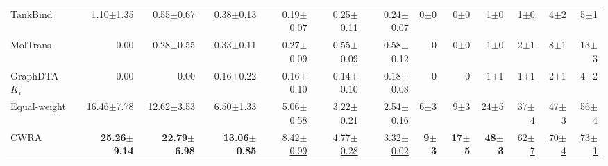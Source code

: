 \begin{table}[htbp!]
\begin{tabular}{lrrrrrr|rrrrrr}
TankBind & 1.10$\pm$1.35 & 0.55$\pm$0.67 & 0.38$\pm$0.13 & 0.19$\pm$0.07 & 0.25$\pm$0.11 & 0.24$\pm$0.07 & 0$\pm$0 & 0$\pm$0 & 1$\pm$0 & 1$\pm$0 & 4$\pm$2 & 5$\pm$1 \\
MolTrans & 0.00 & 0.28$\pm$0.55 & 0.33$\pm$0.11 & 0.27$\pm$0.09 & 0.55$\pm$0.09 & 0.58$\pm$0.12 & 0 & 0$\pm$0 & 1$\pm$0 & 2$\pm$1 & 8$\pm$1 & 13$\pm$3 \\
GraphDTA $K_{i}$ & 0.00 & 0.00 & 0.16$\pm$0.22 & 0.16$\pm$0.10 & 0.14$\pm$0.10 & 0.18$\pm$0.08 & 0 & 0 & 1$\pm$1 & 1$\pm$1 & 2$\pm$1 & 4$\pm$2 \\
\midrule
Equal-weight & 16.46$\pm$7.78 & 12.62$\pm$3.53 & 6.50$\pm$1.33 & 5.06$\pm$0.58 & 3.22$\pm$0.21 & 2.54$\pm$0.16 & 6$\pm$3 & 9$\pm$3 & 24$\pm$5 & 37$\pm$4 & 47$\pm$3 & 56$\pm$4 \\
CWRA & \textbf{25.26$\pm$9.14} & \textbf{22.79$\pm$6.98} & \textbf{13.06$\pm$0.85} & \underline{8.42$\pm$0.99} & \underline{4.77$\pm$0.28} & \underline{3.32$\pm$0.02} & \textbf{9$\pm$3} & \textbf{17$\pm$5} & \textbf{48$\pm$3} & \underline{62$\pm$7} & \underline{70$\pm$4} & \underline{73$\pm$1} \\
\bottomrule
\end{tabular}
\end{table}